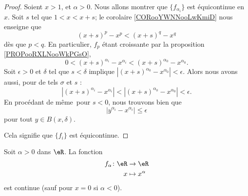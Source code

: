 \begin{proof}
    Soient \( x>1\), et \( \alpha>0\). Nous allons montrer que \( \{ f_{\alpha_i} \}\) est équicontinue en \( x\). Soit \( s\) tel que \( 1<x<x+s\); le corolaire \ref{CORooYWNNooLwKmiD} nous enseigne que 
    \begin{equation}
        (x+s)^p-x^p<(x+s)^q-x^q
    \end{equation}
    dès que \( p<q\). En particulier, \( f_p\) étant croissante par la proposition \ref{PROPooRXLNooWkPGsO},
    \begin{equation}
        0<(x+s)^{\alpha_i}-x^{\alpha_i}<(x+s)^{\alpha_0}-x^{\alpha_0}.
    \end{equation}
    Soit \( \epsilon>0\) et \( \delta\) tel que \( s<\delta\) implique \( | (x+s)^{\alpha_0}-x^{\alpha_0} |<\epsilon\). Alors nous avons aussi, pour de tels \( \sigma\) et \( s\) :
    \begin{equation}
        |(x+s)^{\alpha_i}-x^{\alpha_i}|<|(x+s)^{\alpha_0}-x^{\alpha_0}|<\epsilon.
    \end{equation}
    En procédant de même\ pour \( s<0\), nous trouvons bien que
    \begin{equation}
        | y^{\alpha_i}-x^{\alpha_i} |\leq \epsilon
    \end{equation}
    pour tout \( y\in B(x,\delta)\).

    Cela signifie que \( \{ f_i \}\) est équicontinue.
\end{proof}


\begin{proposition}      \label{PROPooUQNZooSSHLqr}
    Soit \( \alpha>0\) dans \( \eR\). La fonction
    \begin{equation}
        \begin{aligned}
            f_{\alpha}\colon \eR&\to \eR \\
            x&\mapsto x^{\alpha} 
        \end{aligned}
    \end{equation}
    est continue (sauf pour \( x=0\) si \( \alpha<0\)).
\end{proposition}

